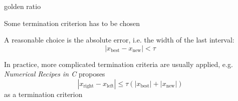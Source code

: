 \documentclass[11pt,compress,t,notes=noshow, xcolor=table]{beamer}
\newcommand{\xleft}{x_{\text{left}}} %
\newcommand{\xright}{x_{\text{right}}} %
\newcommand{\xnew}{x_{\text{new}}} %
\newcommand{\xbest}{x_{\text{best}}} %
\begin{document}
\begin{framei}[sep=L]{golden ratio}
\item Some termination criterion has to be chosen 
\item A reasonable choice is the absolute error, i.e. the width of the last interval:
$$|\xbest-\xnew| < \tau$$
\item In practice, more complicated termination criteria are usually applied, e.g. \emph{Numerical Recipes in C}  proposes
$$|\xright-\xleft| \le \tau (|\xbest| + |\xnew|)$$
as a termination criterion
\end{framei}

\endlecture
\end{document}
